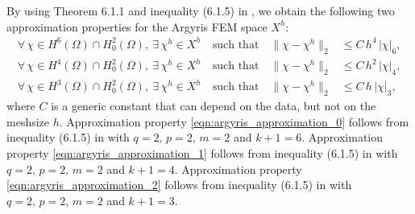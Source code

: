 By using Theorem 6.1.1 and inequality (6.1.5) in \cite{Ciarlet}, we obtain the following two
approximation properties for the Argyris FEM space $X^h$:
\begin{align}
  \forall \, \chi \in H^6(\Omega) \cap H^2_0(\Omega), \ \exists \, \chi^h \in X^h
  \quad \text{such that} \quad
  \| \chi - \chi^h \|_2
  &\leq C \, h^4 \, | \chi |_6 ,
  \label{eqn:argyris_approximation_0} \\[0.2cm]
  \forall \, \chi \in H^4(\Omega) \cap H^2_0(\Omega), \ \exists \, \chi^h \in X^h
  \quad \text{such that} \quad
  \| \chi - \chi^h \|_2
  &\leq C \, h^2 \, | \chi |_4 ,
  \label{eqn:argyris_approximation_1} \\[0.2cm]
  \forall \, \chi \in H^3(\Omega) \cap H^2_0(\Omega), \ \exists \, \chi^h \in X^h
  \quad \text{such that} \quad
  \| \chi - \chi^h \|_2
  &\leq C \, h \, | \chi |_3 ,
  \label{eqn:argyris_approximation_2}
\end{align}
where $C$ is a generic constant that can depend on the data, but not on the meshsize $h$.
Approximation property \eqref{eqn:argyris_approximation_0} follows from inequality (6.1.5) in
\cite{Ciarlet} with $q = 2, \, p = 2, \, m = 2$ and $k+1 = 6$. Approximation property
\eqref{eqn:argyris_approximation_1} follows from inequality (6.1.5) in \cite{Ciarlet} with $q = 2,
\, p = 2, \, m = 2$ and $k+1 = 4$. Approximation property \eqref{eqn:argyris_approximation_2}
follows from inequality (6.1.5) in \cite{Ciarlet} with $q = 2, \, p = 2, \, m = 2$ and $k+1 = 3$.

